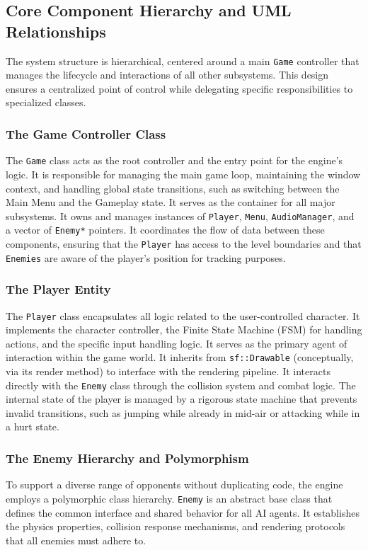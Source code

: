 \documentclass[10pt, a4paper]{article}
\begin{document}
\subsection{Core Component Hierarchy and UML Relationships}
The system structure is hierarchical, centered around a main \texttt{Game} controller that manages the lifecycle and interactions of all other subsystems. This design ensures a centralized point of control while delegating specific responsibilities to specialized classes.

\subsubsection{The Game Controller Class}
The \texttt{Game} class acts as the root controller and the entry point for the engine's logic. It is responsible for managing the main game loop, maintaining the window context, and handling global state transitions, such as switching between the Main Menu and the Gameplay state. It serves as the container for all major subsystems. It owns and manages instances of \texttt{Player}, \texttt{Menu}, \texttt{AudioManager}, and a vector of \texttt{Enemy*} pointers. It coordinates the flow of data between these components, ensuring that the \texttt{Player} has access to the level boundaries and that \texttt{Enemies} are aware of the player's position for tracking purposes.

\subsubsection{The Player Entity}
The \texttt{Player} class encapsulates all logic related to the user-controlled character. It implements the character controller, the Finite State Machine (FSM) for handling actions, and the specific input handling logic. It serves as the primary agent of interaction within the game world. It inherits from \texttt{sf::Drawable} (conceptually, via its render method) to interface with the rendering pipeline. It interacts directly with the \texttt{Enemy} class through the collision system and combat logic. The internal state of the player is managed by a rigorous state machine that prevents invalid transitions, such as jumping while already in mid-air or attacking while in a hurt state.

\subsubsection{The Enemy Hierarchy and Polymorphism}
To support a diverse range of opponents without duplicating code, the engine employs a polymorphic class hierarchy. \texttt{Enemy} is an abstract base class that defines the common interface and shared behavior for all AI agents. It establishes the physics properties, collision response mechanisms, and rendering protocols that all enemies must adhere to. 
\end{document}
